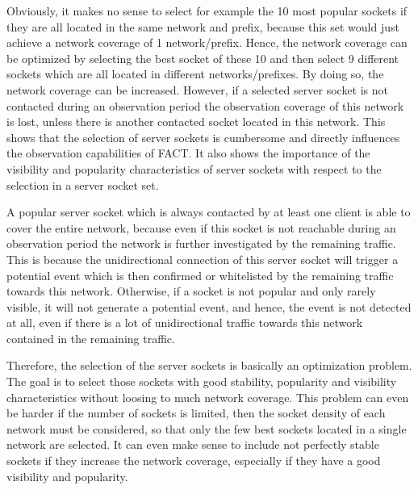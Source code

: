 Obviously, it makes no sense to select for example the 10 most popular sockets if they are all located in the same network and prefix, because this set would just achieve a network coverage of 1 network/prefix. 
Hence, the network coverage can be optimized by selecting the best socket of these 10 and then select 9 different sockets which are all located in different networks/prefixes. 
By doing so, the network coverage can be increased. However, if a selected  \gls{server socket} is not contacted during an observation period the observation coverage of this network is lost, unless there is another contacted socket located in this network. 
This shows that the selection of \glspl{server socket} is cumbersome and directly influences the observation capabilities of FACT. It also shows the importance of the visibility and popularity characteristics of \glspl{server socket} with respect to the selection in a \gls{server socket} set. 

A popular \gls{server socket} which is always contacted by at least one client is able to cover the entire network, because even if this socket is not reachable during an observation period the network is further investigated by the remaining traffic. 
This is because the unidirectional connection of this \gls{server socket} will trigger a potential event which is then confirmed or whitelisted by the  remaining traffic towards this network. 
Otherwise, if a socket is not popular and only rarely visible, it will not generate a potential event, and hence, the event is not detected at all, even if there is a lot of unidirectional traffic towards this network contained in the remaining traffic. 

Therefore, the selection of the \glspl{server socket} is basically an optimization problem. 
The goal is to select those sockets with good stability, popularity and visibility characteristics without loosing to much network coverage. 
This problem can even be harder if the number of sockets is limited, then the socket density of each network must be considered, so that only the few best sockets located in a single network are selected.
It can even make sense to include not perfectly 
stable sockets if they increase the network coverage, especially if they have a good visibility and popularity.
